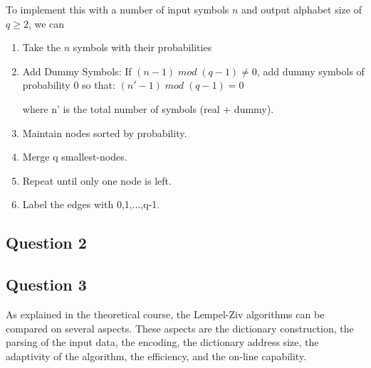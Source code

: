 \documentclass[]{template}
\begin{document}
        \noindent
        To implement this with a number of input symbols $n$ and output alphabet size of $q \geq 2$, we can
        
        \begin{enumerate}
            \item Take the $n$ symbols with their probabilities
            \item Add Dummy Symbols: If $(n-1) \; mod \; (q-1) \neq  0$, add dummy symbols of probability 0 so that:
            $(n' - 1) \; mod \; (q-1)=0$
            
            where n' is the total number of symbols (real + dummy).
            \item Maintain nodes sorted by probability.  
            \item Merge q smallest-nodes.
            \item Repeat until only one node is left.
            \item Label the edges with 0,1,...,q-1.
        \end{enumerate}
        
    \subsection{Question 2}

    \subsection{Question 3}

    As explained in the theoretical course, the Lempel-Ziv algorithms can be compared on several aspects. These aspects are the dictionary construction,
    the parsing of the input data, the encoding, the dictionary address size, the adaptivity of the algorithm, the efficiency, and the on-line capability.
    
\end{document}
